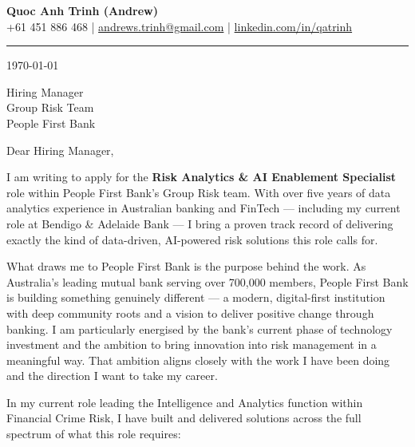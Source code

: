 \documentclass[11pt, a4paper]{letter}
\begin{document}
\begin{center}
    {\LARGE \textbf{Quoc Anh Trinh (Andrew)}}\\[4pt]
    {\small
        +61 451 886 468 \quad|\quad
        \href{mailto:andrews.trinh@gmail.com}{andrews.trinh@gmail.com} \quad|\quad
        \href{https://www.linkedin.com/in/qatrinh}{linkedin.com/in/qatrinh}
    }
\end{center}

\vspace{6pt}
\hrule
\vspace{14pt}

\today

\vspace{8pt}

Hiring Manager\\
Group Risk Team\\
People First Bank

\vspace{10pt}

Dear Hiring Manager,

I am writing to apply for the \textbf{Risk Analytics \& AI Enablement Specialist} role within People First Bank's Group Risk team. With over five years of data analytics experience in Australian banking and FinTech --- including my current role at Bendigo \& Adelaide Bank --- I bring a proven track record of delivering exactly the kind of data-driven, AI-powered risk solutions this role calls for.

What draws me to People First Bank is the purpose behind the work. As Australia's leading mutual bank serving over 700,000 members, People First Bank is building something genuinely different --- a modern, digital-first institution with deep community roots and a vision to deliver positive change through banking. I am particularly energised by the bank's current phase of technology investment and the ambition to bring innovation into risk management in a meaningful way. That ambition aligns closely with the work I have been doing and the direction I want to take my career.

In my current role leading the Intelligence and Analytics function within Financial Crime Risk, I have built and delivered solutions across the full spectrum of what this role requires:
\end{document}
